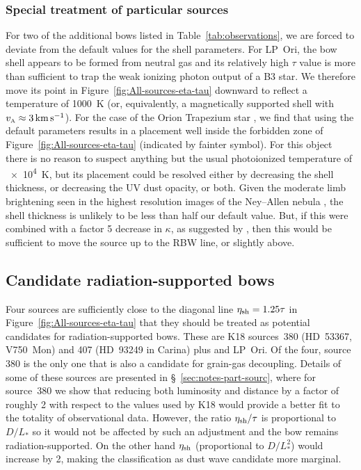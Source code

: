 \message{ !name(bs-bw-dw-03.tex)}\documentclass[useAMS, usenatbib, a4paper]{mnras}
\begin{document}
\subsubsection{Special treatment of particular sources}
\label{sec:spec-treatm-part}

For two of the additional bows listed in Table~\ref{tab:observations},
we are forced to deviate from the default values for the shell
parameters.  For LP~Ori, the bow shell appears to be formed from
neutral gas \citep{ODell:2001c} and its relatively high \(\tau\) value
is more than sufficient to trap the weak ionizing photon output of a
B3 star.  We therefore move its point in
Figure~\ref{fig:All-sources-eta-tau} downward to reflect a temperature
of \SI{1000}{K} (or, equivalently, a magnetically supported shell with
\(v_{\scriptscriptstyle\text{A}} \approx \SI{3}{km.s^{-1}}\)).  For the case of the Orion
Trapezium star \thD{}, we find that using the default parameters
results in a placement well inside the forbidden zone of
Figure~\ref{fig:All-sources-eta-tau} (indicated by fainter symbol).
For this object there is no reason to suspect anything but the usual
photoionized temperature of \SI{e4}{K}, but its placement could be
resolved either by decreasing the shell thickness, or decreasing the
UV dust opacity, or both. Given the moderate limb brightening seen in
the highest resolution images of the Ney--Allen nebula
\citep{Robberto:2005a, Smith:2005a}, the shell thickness is unlikely
to be less than half our default value.  But, if this were combined
with a factor 5 decrease in \(\kappa\), as suggested by
\citet{Salgado:2016a}, then this would be sufficient to move the
source up to the RBW line, or slightly above.


\subsection{Candidate radiation-supported bows}
\label{sec:cand-radi-supp}

Four sources are sufficiently close to the diagonal line
\(\eta_{\text{sh}} = 1.25 \tau\) in Figure~\ref{fig:All-sources-eta-tau}
that they should be treated as potential candidates for
radiation-supported bows. These are K18 sources~380 (HD~53367,
V750~Mon) and 407 (HD~93249 in Carina) plus \thD{} and LP~Ori.  Of the
four, source 380 is the only one that is also a candidate for
grain-gas decoupling.  Details of some of these sources are presented
in \S~\ref{sec:notes-part-sourc}, where for source~380 we show that
reducing both luminosity and distance by a factor of roughly 2 with
respect to the values used by K18 would provide a better fit to the
totality of observational data.  However, the ratio
\(\eta_{\text{sh}} /\tau\) is proportional to \(D / L_*\) so it would not be
affected by such an adjustment and the bow remains
radiation-supported.  On the other hand \(\eta_{\text{sh}}\) (proportional
to \(D / L_*^2\)) would increase by 2, making the classification as
dust wave candidate more marginal.
\end{document}

